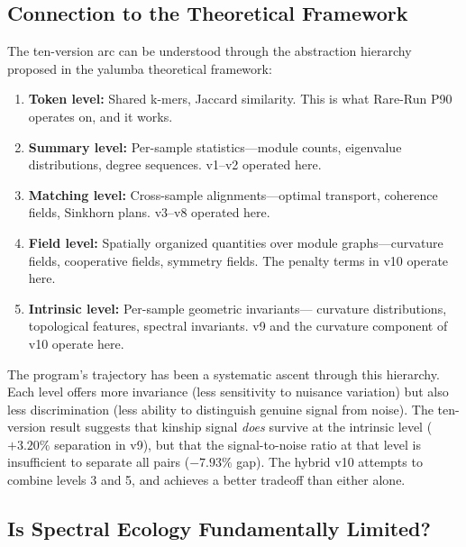 \documentclass{../yalumba}
\begin{document}
\subsection{Connection to the Theoretical Framework}

The ten-version arc can be understood through the abstraction hierarchy
proposed in the yalumba theoretical framework:

\begin{enumerate}
\item \textbf{Token level:} Shared k-mers, Jaccard similarity.  This is
  what Rare-Run P90 operates on, and it works.
\item \textbf{Summary level:} Per-sample statistics---module counts,
  eigenvalue distributions, degree sequences.  v1--v2 operated here.
\item \textbf{Matching level:} Cross-sample alignments---optimal
  transport, coherence fields, Sinkhorn plans.  v3--v8 operated here.
\item \textbf{Field level:} Spatially organized quantities over module
  graphs---curvature fields, cooperative fields, symmetry fields.  The
  penalty terms in v10 operate here.
\item \textbf{Intrinsic level:} Per-sample geometric invariants---
  curvature distributions, topological features, spectral invariants.
  v9 and the curvature component of v10 operate here.
\end{enumerate}


The program's trajectory has been a systematic ascent through this
hierarchy.  Each level offers more invariance (less sensitivity to
nuisance variation) but also less discrimination (less ability to
distinguish genuine signal from noise).  The ten-version result
suggests that kinship signal \emph{does} survive at the intrinsic level
($+3.20\%$ separation in v9), but that the signal-to-noise ratio at
that level is insufficient to separate all pairs ($-7.93\%$ gap).
The hybrid v10 attempts to combine levels 3 and 5, and achieves a
better tradeoff than either alone.

\subsection{Is Spectral Ecology Fundamentally Limited?}
\end{document}
